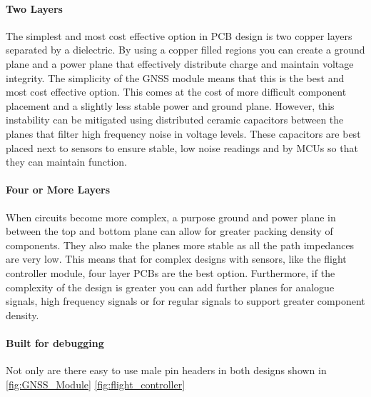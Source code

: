 \paragraph{Two Layers}
The simplest and most cost effective option in \gls{PCB} design is two copper layers separated by a dielectric. By using a copper filled regions you can create a ground plane and a power plane that effectively distribute charge and maintain voltage integrity. The simplicity of the \gls{GNSS} module means that this is the best and most cost effective option. This comes at the cost of more difficult component placement and a slightly less stable power and ground plane. However, this instability can be mitigated using distributed ceramic capacitors between the planes that filter high frequency noise in voltage levels. These capacitors are best placed next to sensors to ensure stable, low noise readings and by \gls{MCU}s so that they can maintain function.
\paragraph{Four or More Layers}
When circuits become more complex, a purpose ground and power plane in between the top and bottom plane can allow for greater packing density of components. They also make the planes more stable as all the path impedances are very low. This means that for complex designs with sensors, like the flight controller module, four layer \gls{PCB}s are the best option. Furthermore, if the complexity of the design is greater you can add further planes for analogue signals, high frequency signals or for regular signals to support greater component density.

\paragraph{Built for debugging}
Not only are there easy to use male pin headers in both designs shown in \ref{fig:GNSS_Module} \ref{fig:flight_controller} 